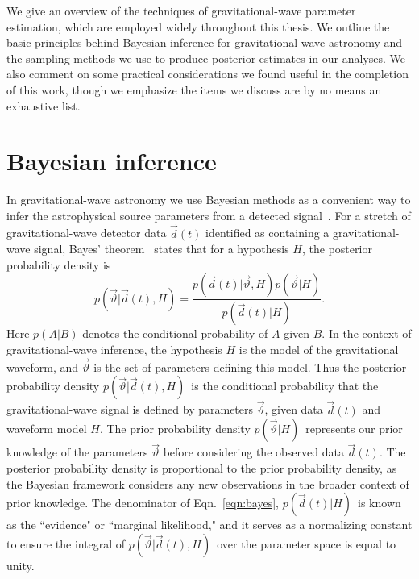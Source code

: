 \newcommand{\pset}{\vartheta}
\newcommand{\likelihood}{\ensuremath{p(\vec{d}(t)|\vec{\pset},H)}}
\newcommand{\prior}{\ensuremath{p(\vec{\pset}|H)}}
\newcommand{\evidence}{\ensuremath{p(\vec{d}(t)|H)}}
\newcommand{\posterior}{\ensuremath{p(\vec{\pset}|\vec{d}(t),H)}}

We give an overview of the techniques of gravitational-wave parameter estimation, which are employed widely throughout this thesis. We outline the basic principles behind Bayesian inference for gravitational-wave astronomy and the sampling methods we use to produce posterior estimates in our analyses. We also comment on some practical considerations we found useful in the completion of this work, though we emphasize the items we discuss are by no means an exhaustive list.

\section{Bayesian inference}\label{sec:bayesian_inference}
In gravitational-wave astronomy we use Bayesian methods as a convenient way to infer the astrophysical source parameters from a detected signal~\cite{FinnChernoff:1993,Cutler:1994ys,Nicholson:1997qh,Christensen:2001cr}. For a stretch of gravitational-wave detector data $\vec{d}(t)$ identified as containing a gravitational-wave signal, Bayes' theorem~\cite{Bayes:1793,Jaynes:2003} states that for a hypothesis $H$, the posterior probability density is
\begin{equation}
\label{eqn:bayes} \posterior =
\frac{\likelihood \prior}{\evidence} .
\end{equation}
Here $p(A|B)$ denotes the conditional probability of $A$ given $B$. In the context of gravitational-wave inference, the hypothesis $H$ is the model of the gravitational waveform, and 
$\vec{\pset}$ is the set of parameters defining this model. Thus the posterior probability density \posterior\ is the conditional probability that the gravitational-wave signal is defined by parameters $\vec{\pset}$, given data $\vec{d}(t)$ and waveform model $H$. The prior probability density \prior\ represents our prior knowledge of the parameters $\vec{\pset}$ before considering the observed data $\vec{d}(t)$. The posterior probability density is proportional to the prior probability density, as the Bayesian framework considers any new observations in the broader context of prior knowledge. The denominator of Eqn.~\ref{eqn:bayes}, \evidence\ is known as the ``evidence" or ``marginal likelihood," and it serves as a normalizing constant to ensure the integral of \posterior\ over the parameter space is equal to unity.

